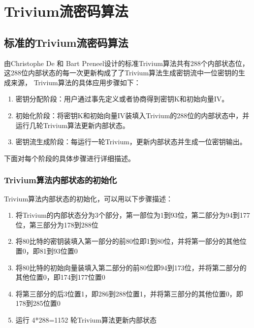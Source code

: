 
\chapter{Trivium流密码算法}

\section{标准的Trivium流密码算法}

由Christophe De 和 Bart Preneel设计的标准Trivium算法共有288个内部状态位，这288位内部状态的每一次更新构成了了Trivium算法生成密钥流中一位密钥的生成来源， Trivium算法的具体应用步骤如下：

\begin{enumerate}[noitemsep,topsep=0pt,parsep=0pt,partopsep=0pt]
  \item 密钥分配阶段：用户通过事先定义或者协商得到密钥K和初始向量IV。
  \item 初始化阶段：将密钥K和初始向量IV装填入Trivium的288位的内部状态中，并运行几轮Trivium算法更新内部状态。
  \item 密钥流生成阶段：每运行一轮Trivium，更新内部状态并生成一位密钥输出。
\end{enumerate}

下面对每个阶段的具体步骤进行详细描述。

\subsection{Trivium算法内部状态的初始化}
Trivium算法内部状态的初始化，可以用以下步骤描述：
\begin{enumerate}[noitemsep,topsep=0pt,parsep=0pt,partopsep=0pt]
  \item 将Trivium的内部状态分为3个部分，第一部位为1到93位，第二部分为94到177位，第三部分为178到288位
  \item 将80比特的密钥装填入第一部分的前80位即1到80位，并将第一部分的其他位置0，即81到93位置0
  \item 将80比特的初始向量装填入第二部分的前80位即94到173位，并将第二部分的其他位置0，即174到177位置0
  \item 将第三部分的后3位置1，即286到288位置1，并将第三部分的其他位置0，即178到285位置0
  \item 运行 4*288=1152 轮Trivium算法更新内部状态
\end{enumerate}

